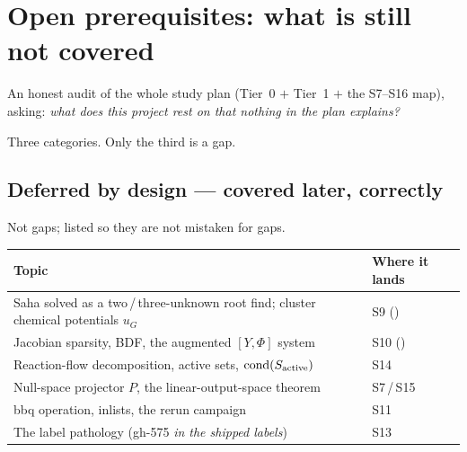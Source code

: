 %

\section{Open prerequisites: what is still not covered}
\label{part:open}

An honest audit of the whole study plan (Tier~0 $+$ Tier~1 $+$ the S7--S16
map), asking: \emph{what does this project rest on that nothing in the plan
explains?}

Three categories. Only the third is a gap.

\subsection{Deferred by design --- covered later, correctly}
\label{sec:deferred}

Not gaps; listed so they are not mistaken for gaps.

\begin{center}
\begin{tabularx}{\textwidth}{@{}Y L{4.6cm}@{}}
\toprule
\textbf{Topic} & \textbf{Where it lands} \\
\midrule
Saha solved as a two\,/\,three-unknown root find; cluster chemical potentials
  $u_G$ & S9 () \\
Jacobian sparsity, BDF, the augmented $[Y, \Phi]$ system &
  S10 () \\
Reaction-flow decomposition, active sets, $\operatorname{cond}(S_{\rm active})$ & S14 \\
Null-space projector $P$, the linear-output-space theorem & S7\,/\,S15 \\
bbq operation, inlists, the rerun campaign & S11 \\
The label pathology (gh-575 \emph{in the shipped labels}) & S13 \\
\bottomrule
\end{tabularx}
\end{center}

